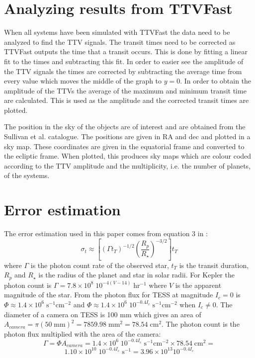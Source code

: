 \documentclass[12pt]{report}
\begin{document}
\section{Analyzing results from TTVFast}
	When all systems have been simulated with TTVFast the data need to be analyzed to find the TTV signals. The transit times need to be corrected as TTVFast outputs the time that a transit occurs. This is done by fitting a linear fit to the times and subtracting this fit. In order to easier see the amplitude of the TTV signals the times are corrected by subtracting the average time from every value which moves the middle of the graph to $y=0$. In order to obtain the amplitude of the TTVs the average of the maximum and minimum transit time are calculated. This is used as the amplitude and the corrected transit times are plotted.
	
	The position in the sky of the objects are of interest and are obtained from the Sullivan et al. catalogue. The positions are given in RA and dec and plotted in a sky map. These coordinates are given in the equatorial frame and converted to the ecliptic frame. When plotted, this produces sky maps which are colour coded according to the TTV amplitude and the multiplicity, i.e. the number of planets, of the systems.
	

\section{Error estimation}
	The error estimation used in this paper comes from equation 3 in \cite{2005Sci...307.1288H}:
	\begin{equation}
		\sigma_t \approx \left[\left(\Gamma t_T\right)^{-1/2}  \left(\frac{R_p}{R_{\star}}\right)^{-3/2}\right] t_T
	\end{equation}
	where $\Gamma$ is the photon count rate of the observed star, $t_T$ is the transit duration, $R_p$ and $R_{\star}$ is the radius of the planet and star in solar radii. For Kepler the photon count is $\Gamma = 7.8 \times 10^8\; 10^{-4(V-14)} \; \mathrm{hr^{-1}}$ where $V$ is the apparent magnitude of the star. From \cite{2015ApJ...809...77S} the photon flux for TESS at magnitude $I_c=0$ is $\Phi \approx 1.4 \times 10^6 \; \mathrm{s^{-1} cm^{-2}}$ and $\Phi \approx 1.4 \times 10^6 \; 10^{-0.4I_c} \; \mathrm{s^{-1} cm^{-2}}$ when $I_c \neq 0$. The diameter of a camera on TESS is 100 mm which gives an area of $A_{camera} = \pi (50 \; \mathrm{mm})^2 = 7859.98 \; \mathrm{mm}^2 = 78.54 \; \mathrm{cm}^2$. The photon count is the photon flux multiplied with the area of the camera:
	\begin{equation}
		\Gamma = \Phi A_{camera} = 1.4 \times 10^6\; 10^{-0.4I_c} \; \mathrm{s^{-1} cm^{-2}} \times 78.54 \; \mathrm{cm}^2 = 
	\end{equation}
	\begin{equation}
	1.10 \times 10^{10}\; 10^{-0.4I_c} \; \mathrm{s}^{-1} = 3.96 \times 10^{13} 10^{-0.4I_c}
	\end{equation}
\end{document}
